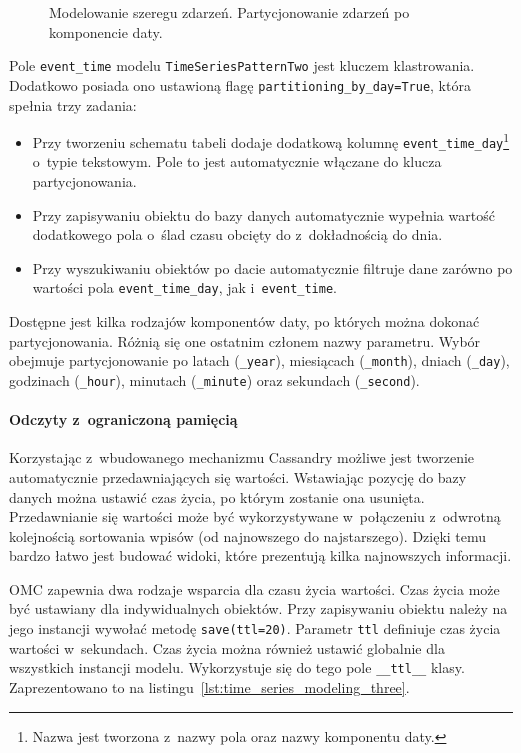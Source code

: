 \begin{figure}[ht!]
	\centering
	\theverbbox
	\caption{Modelowanie szeregu zdarzeń. Partycjonowanie zdarzeń po komponencie daty.}
	\label{lst:time_series_modeling_two}
\end{figure}

Pole \verb+event_time+ modelu \verb+TimeSeriesPatternTwo+ jest kluczem klastrowania. Dodatkowo posiada ono ustawioną flagę \verb+partitioning_by_day=True+, która spełnia trzy zadania:

\begin{itemize}
	\item Przy tworzeniu schematu tabeli dodaje dodatkową kolumnę \verb+event_time_day+\footnote{Nazwa jest tworzona z~nazwy pola oraz nazwy komponentu daty.} o~typie tekstowym. Pole to jest automatycznie włączane do klucza partycjonowania.
	\item Przy zapisywaniu obiektu do bazy danych automatycznie wypełnia wartość dodatkowego pola o~ślad czasu obcięty do z~dokładnością do dnia.
	\item Przy wyszukiwaniu obiektów po dacie automatycznie filtruje dane zarówno po wartości pola \verb+event_time_day+, jak i~\verb+event_time+.
\end{itemize}

Dostępne jest kilka rodzajów komponentów daty, po których można dokonać partycjonowania. Różnią się one ostatnim członem nazwy parametru. Wybór obejmuje partycjonowanie po latach (\verb+_year+), miesiącach (\verb+_month+), dniach (\verb+_day+), godzinach (\verb+_hour+), minutach (\verb+_minute+) oraz sekundach (\verb+_second+).

\paragraph{Odczyty z~ograniczoną pamięcią}

Korzystając z~wbudowanego mechanizmu Cassandry możliwe jest tworzenie automatycznie przedawniających się wartości. Wstawiając pozycję do bazy danych można ustawić czas życia, po którym zostanie ona usunięta. Przedawnianie się wartości może być wykorzystywane w~połączeniu z~odwrotną kolejnością sortowania wpisów (od najnowszego do najstarszego). Dzięki temu bardzo łatwo jest budować widoki, które prezentują kilka najnowszych informacji.

OMC zapewnia dwa rodzaje wsparcia dla czasu życia wartości. Czas życia może być ustawiany dla indywidualnych obiektów. Przy zapisywaniu obiektu należy na jego instancji wywołać metodę \verb+save(ttl=20)+. Parametr \verb+ttl+ definiuje czas życia wartości w~sekundach. Czas życia można również ustawić globalnie dla wszystkich instancji modelu. Wykorzystuje się do tego pole \verb+__ttl__+ klasy. Zaprezentowano to na listingu~\ref{lst:time_series_modeling_three}.

